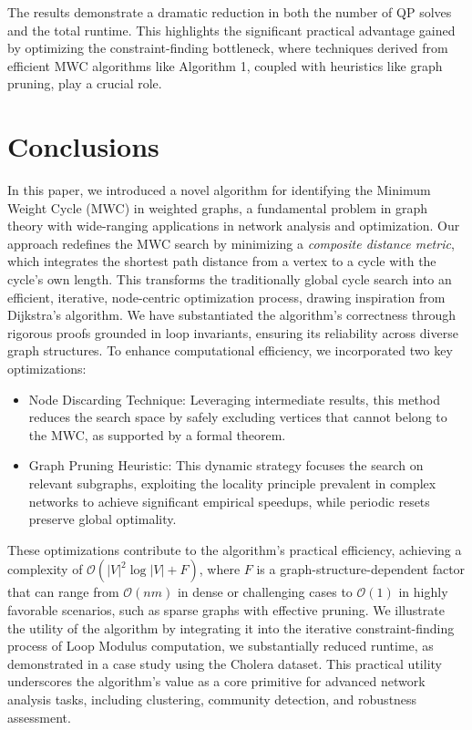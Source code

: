 \documentclass{article}
\begin{document}
The results demonstrate a dramatic reduction in both the number of QP solves and the total runtime. This highlights the significant practical advantage gained by optimizing the constraint-finding bottleneck, where techniques derived from efficient MWC algorithms like Algorithm 1, coupled with heuristics like graph pruning, play a crucial role.

\section{Conclusions}
\label{sec:conclusion}

In this paper, we introduced a novel algorithm for identifying the Minimum Weight Cycle (MWC) in weighted graphs, a fundamental problem in graph theory with wide-ranging applications in network analysis and optimization. Our approach redefines the MWC search by minimizing a \textit{composite distance metric}, which integrates the shortest path distance from a vertex to a cycle with the cycle's own length. This transforms the traditionally global cycle search into an efficient, iterative, node-centric optimization process, drawing inspiration from Dijkstra's algorithm. We have substantiated the algorithm's correctness through rigorous proofs grounded in loop invariants, ensuring its reliability across diverse graph structures.
To enhance computational efficiency, we incorporated two key optimizations:
\begin{itemize}
    \item Node Discarding Technique: Leveraging intermediate results, this method reduces the search space by safely excluding vertices that cannot belong to the MWC, as supported by a formal theorem.
    \item Graph Pruning Heuristic: This dynamic strategy focuses the search on relevant subgraphs, exploiting the locality principle prevalent in complex networks to achieve significant empirical speedups, while periodic resets preserve global optimality.
\end{itemize}
These optimizations contribute to the algorithm's practical efficiency, achieving a complexity of \(\mathcal{O}(|V|^2 \log |V| + F)\), where \(F\) is a graph-structure-dependent factor that can range from \(\mathcal{O}(nm)\) in dense or challenging cases to \(\mathcal{O}(1)\) in highly favorable scenarios, such as sparse graphs with effective pruning. We illustrate the utility of the algorithm by integrating it into the iterative constraint-finding process of Loop Modulus computation, we substantially reduced runtime, as demonstrated in a case study using the Cholera dataset. This practical utility underscores the algorithm's value as a core primitive for advanced network analysis tasks, including clustering, community detection, and robustness assessment.
\end{document}
